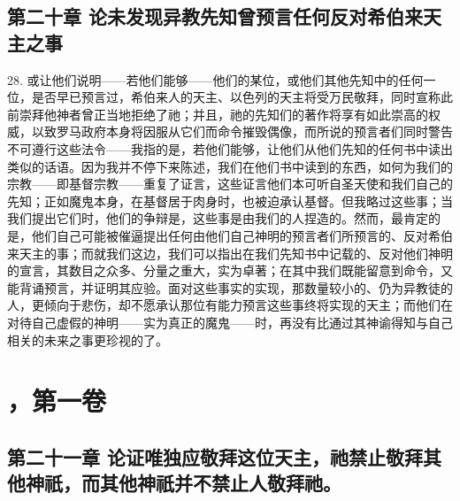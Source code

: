 
\subsection{第二十章 论未发现异教先知曾预言任何反对希伯来天主之事}

28. 或让他们说明——若他们能够——他们的某位，或他们其他先知中的任何一位，是否早已预言过，希伯来人的天主、以色列的天主将受万民敬拜，同时宣称此前崇拜他神者曾正当地拒绝了祂；并且，祂的先知们的著作将享有如此崇高的权威，以致罗马政府本身将因服从它们而命令摧毁偶像，而所说的预言者们同时警告不可遵行这些法令——我指的是，若他们能够，让他们从他们先知的任何书中读出类似的话语。因为我并不停下来陈述，我们在他们书中读到的东西，如何为我们的宗教——即基督宗教——重复了证言，这些证言他们本可听自圣天使和我们自己的先知；正如魔鬼本身，在基督居于肉身时，也被迫承认基督。但我略过这些事；当我们提出它们时，他们的争辩是，这些事是由我们的人捏造的。然而，最肯定的是，他们自己可能被催逼提出任何由他们自己神明的预言者们所预言的、反对希伯来天主的事；而就我们这边，我们可以指出在我们先知书中记载的、反对他们神明的宣言，其数目之众多、分量之重大，实为卓著；在其中我们既能留意到命令，又能背诵预言，并证明其应验。面对这些事实的实现，那数量较小的、仍为异教徒的人，更倾向于悲伤，却不愿承认那位有能力预言这些事终将实现的天主；而他们在对待自己虚假的神明——实为真正的魔鬼——时，再没有比通过其神谕得知与自己相关的未来之事更珍视的了。\par



\section{，第一卷}


\subsection{第二十一章  论证唯独应敬拜这位天主，祂禁止敬拜其他神祇，而其他神祇并不禁止人敬拜祂。}

